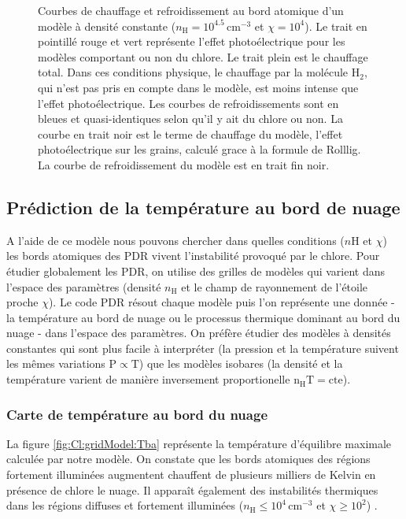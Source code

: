 \begin{figure}[!h]
    \caption{Courbes de chauffage et refroidissement au bord atomique d'un modèle à densité constante ($n_\mathrm{H} = 10^{4.5} \,\mathrm{cm}^{-3}$ et $\chi = 10^4$). Le trait en pointillé rouge et vert représente l'effet photoélectrique pour les modèles comportant ou non du chlore.  Le trait plein est le chauffage total. Dans ces conditions physique, le chauffage par la molécule $\mathrm{H}_2$, qui n'est pas pris en compte dans le modèle, est moins intense que l'effet photoélectrique. Les courbes de refroidissements sont en bleues et quasi-identiques selon qu'il y ait du chlore ou non. La courbe en trait noir est le terme de chauffage du modèle, l'effet photoélectrique sur les grains, calculé grace à la formule de Rolllig. La courbe de refroidissement du modèle est en trait fin noir.}
    \label{fig:Cl:modelPE:GC}
\end{figure}

\subsection{Prédiction de la température au bord de nuage}
 
A l'aide de ce modèle nous pouvons chercher dans quelles conditions ($n\mathrm{H}$ et $\chi$) les bords atomiques des PDR vivent l'instabilité provoqué par le chlore. Pour étudier globalement les PDR, on utilise des grilles de modèles qui varient dans l'espace des paramètres (densité $n_\mathrm{H}$ et le champ de rayonnement de l'étoile proche $\chi$). Le code PDR résout chaque modèle puis l'on représente une donnée - la température au bord de nuage ou le processus thermique dominant au bord du nuage - dans l'espace des paramètres. On préfère étudier des modèles à densités constantes qui sont plus facile à interpréter (la pression et la température suivent les mêmes variations $\mathrm{P}\propto \mathrm{T}$) que les modèles isobares (la densité et la température varient de manière inversement proportionelle $\mathrm{n}_\mathrm{H}\mathrm{T}=\mathrm{cte}$). 


\subsubsection{Carte de température au bord du nuage}

La figure \ref{fig:Cl:gridModel:Tba} représente la température d'équilibre maximale calculée par notre modèle. On constate que les bords atomiques des régions fortement illuminées augmentent chauffent de plusieurs milliers de Kelvin en présence de chlore le nuage. 
Il apparaît également des instabilités thermiques dans les régions diffuses et fortement illuminées ($n_\mathrm{H} \leq 10^4 \, \mathrm{cm}^{-3}$ et $\chi \geq 10^2$) . \newline 


